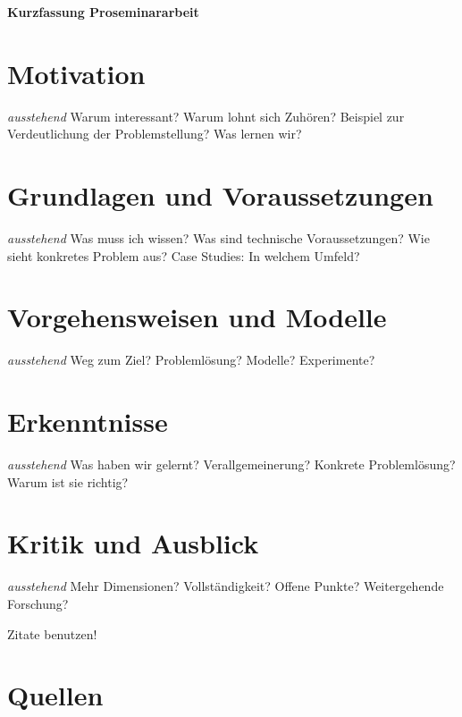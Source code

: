 \documentclass[12pt]{scrartcl}
\begin{document}
\begin{center}
\textbf{\fontsize{16}{16}\selectfont Kurzfassung Proseminararbeit}
\end{center}

\bigskip

\section*{Motivation}

\textit{ausstehend} Warum interessant? Warum lohnt sich Zuhören? Beispiel zur Verdeutlichung der Problemstellung? Was lernen wir?

\section*{Grundlagen und Voraussetzungen}

\textit{ausstehend} Was muss ich wissen? Was sind technische Voraussetzungen? Wie sieht konkretes Problem aus? Case Studies: In welchem Umfeld?

\section*{Vorgehensweisen und Modelle}

\textit{ausstehend} Weg zum Ziel? Problemlösung? Modelle? Experimente?

\section*{Erkenntnisse}

\textit{ausstehend} Was haben wir gelernt? Verallgemeinerung? Konkrete Problemlösung? Warum ist sie richtig?

\section*{Kritik und Ausblick}

\textit{ausstehend} Mehr Dimensionen? Vollständigkeit? Offene Punkte? Weitergehende Forschung?

Zitate benutzen! \cite{microBpm}
\section*{Quellen}
\printbibliography[heading=none]
\end{document}
